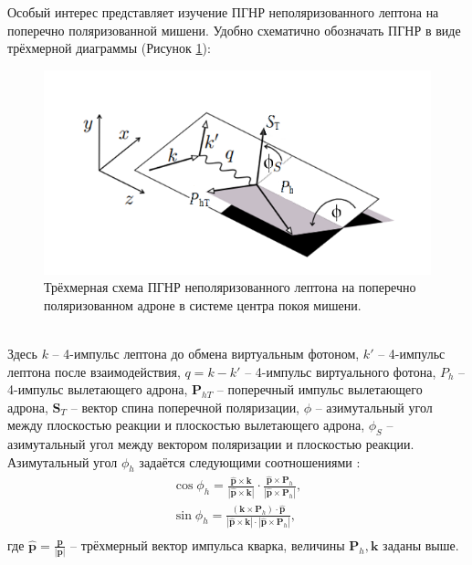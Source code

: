 \documentclass{extreport}
\begin{document}
Особый интерес представляет изучение ПГНР неполяризованного лептона на поперечно поляризованной мишени.  Удобно схематично обозначать ПГНР в виде трёхмерной диаграммы (Рисунок \ref{fig:sidis}):
\begin{figure}[h]
	\centering
	\includegraphics{sidis.png}
	\caption{Трёхмерная схема ПГНР неполяризованного лептона на поперечно поляризованном адроне в системе центра покоя мишени.}
	\label{fig:sidis}
\end{figure} \\
Здесь $k$ -- 4-импульс лептона до обмена виртуальным фотоном, $k'$ -- 4-импульс лептона после взаимодействия, $q = k-k'$ -- 4-импульс виртуального фотона, $P_h$ -- 4-импульс вылетающего адрона, $\textbf{P}_{hT}$ -- поперечный импульс вылетающего адрона, $\textbf{S}_T$ -- вектор спина поперечной поляризации, $\phi$ -- азимутальный угол между плоскостью реакции и плоскостью вылетающего адрона, $\phi_S$ -- азимутальный угол между вектором поляризации и плоскостью реакции. Азимутальный угол $\phi_h$ задаётся следующими соотношениями \cite{Bacchetta_2004}:
\begin{equation}
	\begin{split}
		\cos \phi_{h} = \frac{\hat{\textbf{p}} \times \textbf{k}}{|\hat{\textbf{p}} \times \textbf{k}|} \cdot \frac{\hat{\textbf{p}}\times \textbf{P}_h}{|\hat{\textbf{p}}\times \textbf{P}_h|}, \\
		\sin \phi_{h} = \frac{(\textbf{k}\times \textbf{P}_h)\cdot \hat{\textbf{p}}}{|\hat{\textbf{p}} \times \textbf{k}|\cdot|\hat{\textbf{p}}\times \textbf{P}_h|}, \\
	\end{split}
\end{equation}
где $\hat{\boldsymbol{p}} = \frac{\boldsymbol{p}}{|\boldsymbol{p}|}$ -- трёхмерный вектор импульса кварка, величины $\textbf{P}_h, \textbf{k}$ заданы выше. 
\end{document}
